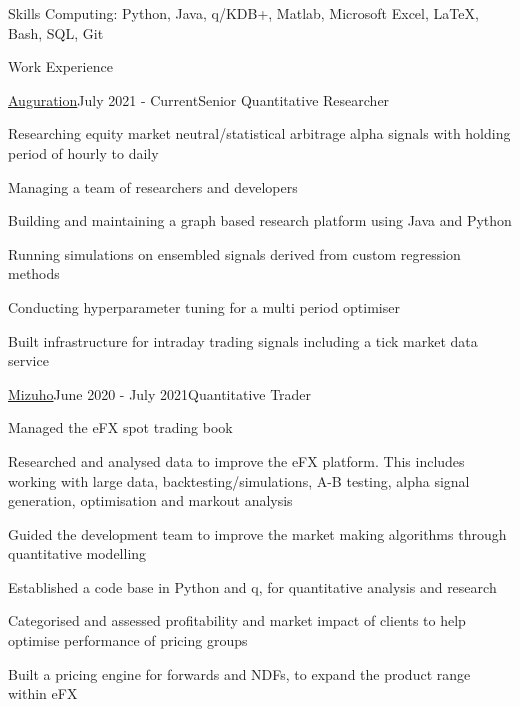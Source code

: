 \documentclass{resume} %
\begin{document}
\begin{rSection}{Skills}
	Computing: Python, Java, q/KDB+, Matlab, Microsoft Excel, LaTeX, Bash, SQL, Git
\end{rSection}
\begin{rSection}{Work Experience}
\begin{rSubsection}{\href{https://www.auguration.com/}{Auguration}}{July 2021 - Current}{Senior Quantitative Researcher}{}
	\item Researching equity market neutral/statistical arbitrage alpha signals with holding period of hourly to daily
	\item Managing a team of researchers and developers
	\item Building and maintaining a graph based research platform using Java and Python
	\item Running simulations on ensembled signals derived from custom regression methods
	\item Conducting hyperparameter tuning for a multi period optimiser
	\item Built infrastructure for intraday trading signals including a tick market data service
	\iffalse
	\item Designing and developing the live trading system
	\fi
\end{rSubsection}
\begin{rSubsection}{\href{https://www.mizuhogroup.com/bank/}{Mizuho}}{June 2020 - July 2021}{Quantitative Trader}{}
	\item Managed the eFX spot trading book
	\item Researched and analysed data to improve the eFX platform. This includes working with large data, backtesting/simulations, A-B testing, alpha signal generation, optimisation and markout analysis 
	\item Guided the development team to improve the market making algorithms through quantitative modelling
	\item Established a code base in Python and q, for quantitative analysis and research
	\iffalse
	\item Categorised and assessed profitability and market impact of clients to help optimise performance of pricing groups	 
	\item Built a pricing engine for forwards and NDFs, to expand the product range within eFX

\end{rSubsection}
\end{rSection}
\end{document}
